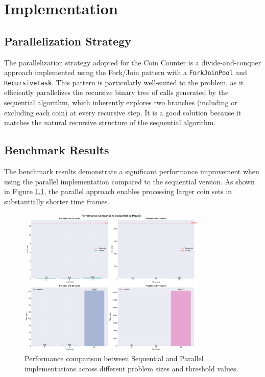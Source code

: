 \chapter{Implementation} \label{cap:implementation}

\section{Parallelization Strategy}

The parallelization strategy adopted for the Coin Counter is a divide-and-conquer approach implemented using the Fork/Join pattern with a \texttt{ForkJoinPool} and \texttt{RecursiveTask}. This pattern is particularly well-suited to the problem, as it efficiently parallelizes the recursive binary tree of calls generated by the sequential algorithm, which inherently explores two branches (including or excluding each coin) at every recursive step. It is a good solution because it matches the natural recursive structure of the sequential algorithm.

\section{Benchmark Results}

The benchmark results demonstrate a significant performance improvement when using the parallel implementation compared to the sequential version. As shown in Figure \ref{fig:benchmark_comparison}, the parallel approach enables processing larger coin sets in substantially shorter time frames.

\begin{figure}[H]
    \centering
    \includegraphics[width=0.8\textwidth]{images/benchmark_comparison.png}
    \caption{Performance comparison between Sequential and Parallel implementations across different problem sizes and threshold values.}
    \label{fig:benchmark_comparison}
\end{figure}


